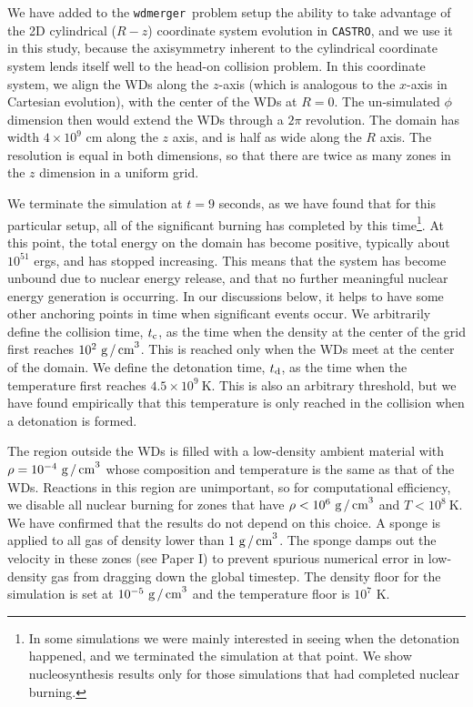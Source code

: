 \documentclass[twocolumn,numberedappendix]{../aastex62}
\newcommand{\castro}{\texttt{CASTRO}}
\newcommand{\wdmerger}{\texttt{wdmerger}}
\begin{document}
We have added to the \wdmerger\ problem setup the ability to take advantage of 
the 2D cylindrical ($R-z$) coordinate system evolution in \castro, and we use it
in this study, because the axisymmetry inherent to the cylindrical coordinate system
lends itself well to the head-on collision problem. In this coordinate system, we
align the WDs along the $z$-axis (which is analogous to the $x$-axis in Cartesian
evolution), with the center of the WDs at $R = 0$. The un-simulated $\phi$ dimension
then would extend the WDs through a $2\pi$ revolution. The domain has width $4 \times 10^{9}$
cm along the $z$ axis, and is half as wide along the $R$ axis. The resolution is equal
in both dimensions, so that there are twice as many zones in the $z$ dimension in
a uniform grid.

We terminate the simulation at $t = 9$ seconds, as we have found that for this
particular setup, all of the significant burning has completed by this time\footnote{In
some simulations we were mainly interested in seeing when the detonation happened, and
we terminated the simulation at that point. We show nucleosynthesis results only for
those simulations that had completed nuclear burning.}. At
this point, the total energy on the domain has become positive, typically about
$10^{51}$ ergs, and has stopped increasing. This means that the system has become
unbound due to nuclear energy release, and that no further meaningful nuclear energy
generation is occurring. In our discussions below, it helps to have some other
anchoring points in time when significant events occur. We arbitrarily define the
collision time, $t_{\rm c}$, as the time when the density at the center of the grid
first reaches $10^2\ \text{g\,/\,cm}^3$. This is reached only when the WDs meet at the
center of the domain. We define the detonation time, $t_{\rm d}$, as the time when the
temperature first reaches $4.5 \times 10^9\ \text{K}$. This is also an arbitrary
threshold, but we have found empirically that this temperature is only reached in
the collision when a detonation is formed.

The region outside the WDs is filled with a low-density ambient
material with $\rho = 10^{-4}\ \text{g\,/\,cm}^{3}$ whose composition and temperature is the
same as that of the WDs. Reactions in this region are unimportant, so for
computational efficiency, we disable all nuclear burning for zones that have
$\rho < 10^6\ \text{g\,/\,cm}^{3}$ and $T < 10^8\ \text{K}$. We have confirmed that
the results do not depend on this choice. A sponge is applied to all gas of density
lower than $1\ \text{g\,/\,cm}^{3}$. The sponge damps out the velocity in these zones
(see Paper I) to prevent spurious numerical error in low-density gas from dragging
down the global timestep. The density floor for the simulation is set
at $10^{-5}\ \text{g\,/\,cm}^{3}$ and the temperature floor is $10^7$ K.
\end{document}
